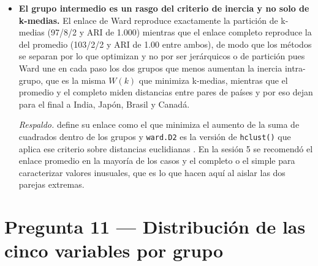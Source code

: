\documentclass[oneside, openany, fontset=libertinus]{mitthesis}
\begin{document}
\begin{notas}
\begin{itemize}
  \emph{Respaldo.} El profesor dijo sobre agrupar en componentes que «en
  general no lo recomiendo» (sesión 4), usó el plano factorial como «una
  herramienta de diagnóstico, no como una parte del proceso» y advirtió
  que las componentes tardías pueden caracterizar un grupo que se pierde
  al quedarse con las primeras (sesión 5), que es lo que mostró
  \textcite{chang1983} y lo que se critica del llamado análisis en
  tándem \parencite{arabie1994}.
\item
  \textbf{El grupo intermedio es un rasgo del criterio de inercia y no
  solo de k-medias.} El enlace de Ward reproduce exactamente la
  partición de k-medias (97/8/2 y ARI de 1.000) mientras que el enlace
  completo reproduce la del promedio (103/2/2 y ARI de 1.00 entre
  ambos), de modo que los métodos se separan por lo que optimizan y no
  por ser jerárquicos o de partición pues Ward une en cada paso los dos
  grupos que menos aumentan la inercia intra-grupo, que es la misma
  \(W(k)\) que minimiza k-medias, mientras que el promedio y el completo
  miden distancias entre pares de países y por eso dejan para el final a
  India, Japón, Brasil y Canadá.

  \emph{Respaldo.} \textcite{ward1963} define su enlace como el que
  minimiza el aumento de la suma de cuadrados dentro de los grupos y
  \texttt{ward.D2} es la versión de \texttt{hclust()} que aplica ese
  criterio sobre distancias euclidianas \parencite{murtagh2014}. En la
  sesión 5 se recomendó el enlace promedio en la mayoría de los casos y
  el completo o el simple para caracterizar valores inusuales, que es lo
  que hacen aquí al aislar las dos parejas extremas.
\end{itemize}

\end{notas}

\Needspace{4in}

\section{Pregunta 11 --- Distribución de las cinco variables por
grupo}\label{p11}

\Needspace{8.33in}
\end{document}

